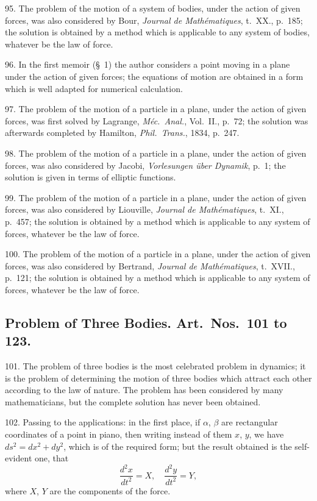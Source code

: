\documentclass[11pt,a4paper]{article}
\begin{document}
95. The problem of the motion of a system of bodies, under the action of given forces, was also considered by Bour, \textit{Journal de Math\'ematiques}, t.~XX., p.~185; the solution is obtained by a method which is applicable to any system of bodies, whatever be the law of force.

96. In the first memoir (\S~1) the author considers a point moving in a plane under the action of given forces; the equations of motion are obtained in a form which is well adapted for numerical calculation.

\newpage
\setcounter{page}{548}

97. The problem of the motion of a particle in a plane, under the action of given forces, was first solved by Lagrange, \textit{M\'ec.\ Anal.}, Vol.~II., p.~72; the solution was afterwards completed by Hamilton, \textit{Phil.\ Trans.}, 1834, p.~247.

98. The problem of the motion of a particle in a plane, under the action of given forces, was also considered by Jacobi, \textit{Vorlesungen \"uber Dynamik}, p.~1; the solution is given in terms of elliptic functions.

99. The problem of the motion of a particle in a plane, under the action of given forces, was also considered by Liouville, \textit{Journal de Math\'ematiques}, t.~XI., p.~457; the solution is obtained by a method which is applicable to any system of forces, whatever be the law of force.

100. The problem of the motion of a particle in a plane, under the action of given forces, was also considered by Bertrand, \textit{Journal de Math\'ematiques}, t.~XVII., p.~121; the solution is obtained by a method which is applicable to any system of forces, whatever be the law of force.

\subsection*{Problem of Three Bodies. Art.\ Nos.\ 101 to 123.}

101. The problem of three bodies is the most celebrated problem in dynamics; it is the problem of determining the motion of three bodies which attract each other according to the law of nature. The problem has been considered by many mathematicians, but the complete solution has never been obtained.

102. Passing to the applications: in the first place, if $\alpha$, $\beta$ are rectangular coordinates of a point in piano, then writing instead of them $x$, $y$, we have $ds^2 = dx^2 + dy^2$, which is of the required form; but the result obtained is the self-evident one, that
\[
\frac{d^2x}{dt^2} = X,\quad \frac{d^2y}{dt^2} = Y,
\]
where $X$, $Y$ are the components of the force.
\end{document}

